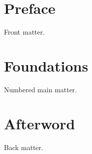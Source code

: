 \documentclass[fontsize=11pt,paper=a4,DIV=12,oneside]{scrbook}
\begin{document}
\frontmatter\tableofcontents\chapter{Preface}Front matter.
\mainmatter\chapter{Foundations}Numbered main matter.
\backmatter\chapter{Afterword}Back matter.
\end{document}
